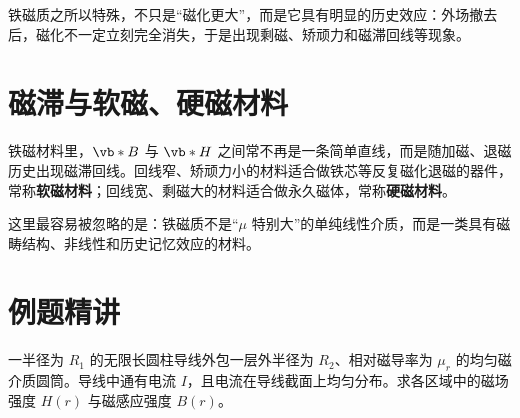 \documentclass[lang=cn,11pt]{elegantbook}
\begin{document}
铁磁质之所以特殊，不只是“磁化更大”，而是它具有明显的历史效应：外场撤去后，磁化不一定立刻完全消失，于是出现剩磁、矫顽力和磁滞回线等现象。

\section{磁滞与软磁、硬磁材料}

铁磁材料里，\(\vb*{B}\) 与 \(\vb*{H}\) 之间常不再是一条简单直线，而是随加磁、退磁历史出现磁滞回线。回线窄、矫顽力小的材料适合做铁芯等反复磁化退磁的器件，常称\textbf{软磁材料}；回线宽、剩磁大的材料适合做永久磁体，常称\textbf{硬磁材料}。

\begin{remark}
这里最容易被忽略的是：铁磁质不是“\(\mu\) 特别大”的单纯线性介质，而是一类具有磁畴结构、非线性和历史记忆效应的材料。
\end{remark}

\section{例题精讲}

\begin{exercise}[\(H\) 与 \(B\) 的分段分工]
一半径为 \(R_1\) 的无限长圆柱导线外包一层外半径为 \(R_2\)、相对磁导率为 \(\mu_r\) 的均匀磁介质圆筒。导线中通有电流 \(I\)，且电流在导线截面上均匀分布。求各区域中的磁场强度 \(H(r)\) 与磁感应强度 \(B(r)\)。
\end{exercise}
\end{document}
